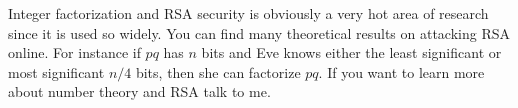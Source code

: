 Integer factorization and RSA security is obviously a very hot
area of research since it is used so widely. You can find many
theoretical results on attacking RSA online. For instance if $pq$
has $n$ bits and Eve knows either the least significant or most
significant $n/4$ bits, then she can factorize $pq$. If you want
to learn more about number theory and RSA talk to me.

